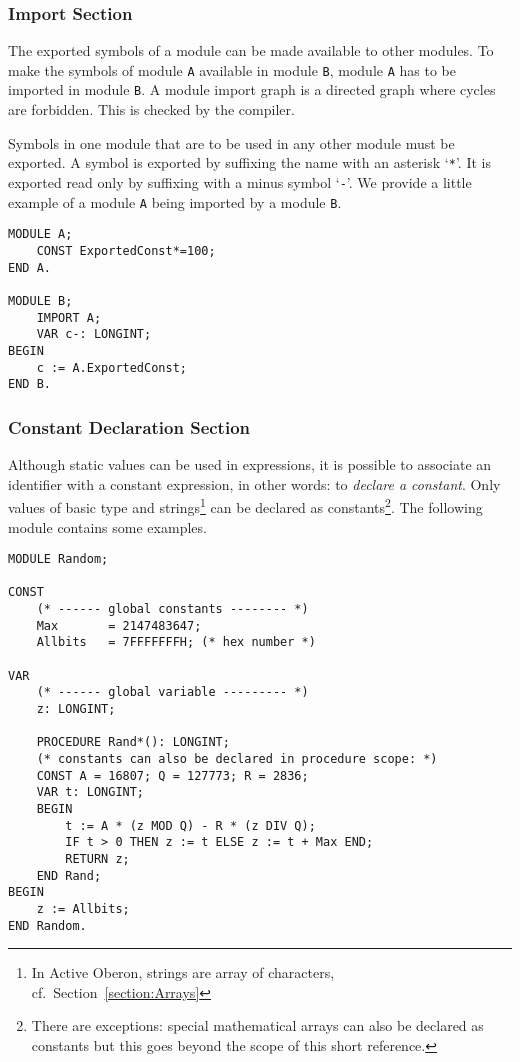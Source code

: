 \documentclass[a4paper,11pt]{article}
\begin{document}
\subsubsection{Import Section} \label{section:ImportList}
The exported symbols of a module can be made available to other modules. To make the symbols of module \verb+A+ available in module \verb+B+, module \verb+A+ has to be imported in module \verb+B+. A module import graph is a directed graph where cycles are forbidden. This is checked by the compiler.

Symbols in one module that are to be used in any other module must be exported. A symbol is exported by suffixing the name with an asterisk `\verb+*+'. It is exported read only by suffixing with a minus symbol `\verb+-+'. We provide a little example of a module \verb+A+ being imported by a module \verb+B+.

\begin{lstlisting}[language=Oberon,frame=none,caption={B imports A}]
MODULE A;
    CONST ExportedConst*=100;
END A.

MODULE B;
    IMPORT A;
    VAR c-: LONGINT;
BEGIN
    c := A.ExportedConst;
END B.
\end{lstlisting}

\subsubsection{Constant Declaration Section}\label{section:ConstantDeclarationSection}
Although static values can be used in expressions, it is possible to associate an identifier with a constant expression, in other words: to {\em declare a constant}. Only values of basic type and strings\footnote{In Active Oberon, strings are array of characters, cf.~Section~\ref{section:Arrays}} can be declared as constants\footnote{There are exceptions: special mathematical arrays can also be declared as constants but this goes beyond the scope of this short reference.}. The following module contains some examples.

\begin{lstlisting}[language=Oberon,frame=none,caption={Declaration and Usage of Constants}]
MODULE Random;

CONST
    (* ------ global constants -------- *)
    Max       = 2147483647;
    Allbits   = 7FFFFFFFH; (* hex number *)

VAR
    (* ------ global variable --------- *)
    z: LONGINT;

    PROCEDURE Rand*(): LONGINT;
    (* constants can also be declared in procedure scope: *)
    CONST A = 16807; Q = 127773; R = 2836;
    VAR t: LONGINT;
    BEGIN
        t := A * (z MOD Q) - R * (z DIV Q);
        IF t > 0 THEN z := t ELSE z := t + Max END;
        RETURN z;
    END Rand;
BEGIN
    z := Allbits;
END Random.
\end{lstlisting}
\end{document}

